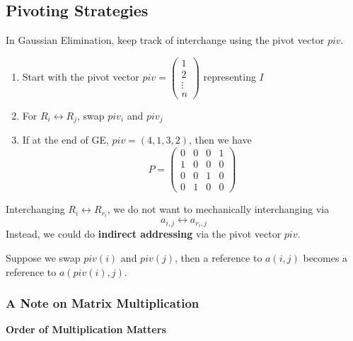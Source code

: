 \subsection{Pivoting Strategies}

In Gaussian Elimination, keep track of interchange using the pivot vector \( piv \).

\begin{enumerate}
    \item Start with the pivot vector \( piv = \begin{pmatrix}
              1 \\ 2 \\ \vdots \\ n
          \end{pmatrix} \) representing \( I \)

    \item For \( R_i \leftrightarrow R_j \), swap \( piv_i \) and \( piv_j \)

    \item If at the end of GE, \( piv = (4, 1, 3, 2) \), then we have \[
              P = \begin{pmatrix}
                  0 & 0 & 0 & 1 \\
                  1 & 0 & 0 & 0 \\
                  0 & 0 & 1 & 0 \\
                  0 & 1 & 0 & 0
              \end{pmatrix}
          \]
\end{enumerate}

\begin{note}
    Interchanging \( R_i \leftrightarrow R_{r_i} \), we do not want to mechanically interchanging via \[
        a_{i, j} \leftrightarrow a_{r_i, j}
    \] Instead, we could do \textbf{indirect addressing} via the pivot vector \( piv \).

    Suppose we swap \( piv(i) \) and \( piv(j) \), then a reference to \( a(i, j) \) becomes a reference to \( a(piv(i), j) \).
\end{note}

\subsubsection{A Note on Matrix Multiplication}

\textbf{Order of Multiplication Matters}

